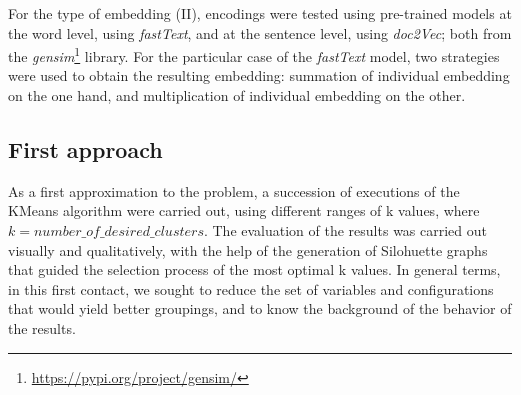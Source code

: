 For the type of embedding (II), encodings were tested using pre-trained models at the word level, using \emph{fastText}, and at the sentence level, using \emph{doc2Vec}; both from the \emph{gensim}\footnote{\url{https://pypi.org/project/gensim/}} library. For the particular case of the \emph{fastText} model, two strategies were used to obtain the resulting embedding: summation of individual embedding on the one hand, and multiplication of individual embedding on the other.

\subsection{First approach}
\label{subsec:first_approach}
As a first approximation to the problem, a succession of executions of the KMeans algorithm were carried out, using different ranges of k values, where $k=number\_of\_desired\_clusters$. The evaluation of the results was carried out visually and qualitatively, with the help of the generation of Silohuette graphs that guided the selection process of the most optimal k values. In general terms, in this first contact, we sought to reduce the set of variables and configurations that would yield better groupings, and to know the background of the behavior of the results.

